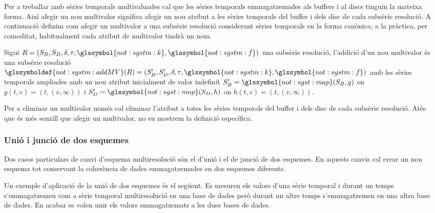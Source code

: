 Per a treballar amb sèries temporals multivaluades cal que les sèries
temporals emmagatzemades als buffers i al discs tinguin la mateixa
forma. Així afegir un nou multivalor significa afegir un nou atribut a
les sèries temporals del buffer i dels disc de cada subsèrie
resolució. A continuació definim com afegir un multivalor a una
subsèrie resolució considerant sèries temporals en la forma canònica;
a la pràctica, per comoditat, habitualment cada atribut de multivalor
tindrà un nom.
\begin{definition}
  Sigui $R = (S_B,S_D,\delta,\tau,\glssymbol{not:sgstm:k},\glssymbol{not:sgstm:f})$ una subsèrie resolució,
  l'addició d'un nou multivalor és una subsèrie resolució
  $\glssymboldef{not:sgstm:addMV}(R) = (S_B',S_D',\delta,\tau,\glssymbol{not:sgstm:k},\glssymbol{not:sgstm:f})$
  amb les sèries temporals ampliades amb un nou atribut inicialment de
  valor indefinit $S'_{B} =
  \glssymbol{not:sgst:map}(S_B,g)$ on $g(t,v)=(t,(v,\infty))$ i $S'_{D}
  = \glssymbol{not:sgst:map}(S_D,h)$ on $h(t,v)=(t,(v,\infty))$.
\end{definition}

Per a eliminar un multivalor només cal eliminar l'atribut a totes les
sèries temporals del buffer i dels disc de cada subsèrie resolució.
Atès que és més senzill que afegir un multivalor, no en mostrem la
definició específica.


\subsubsection{Unió i junció de dos esquemes}



Dos casos particulars de canvi d'esquema multiresolució són el d'unió
i el de junció de dos esquemes. En aquests canvis cal crear un nou
esquema tot conservant la coherència de dades emmagatzemades en dos
esquemes diferents.

Un exemple d'aplicació de la unió de dos esquemes és el següent. Es
mesuren els valors d'una sèrie temporal i durant un temps
s'emmagatzemen com a sèrie temporal multiresolució en una base de
dades però durant un altre temps s'emmagatzemen en una altra base de
dades. En acabar es volen unir els valors emmagatzemats a les dues
bases de dades.




